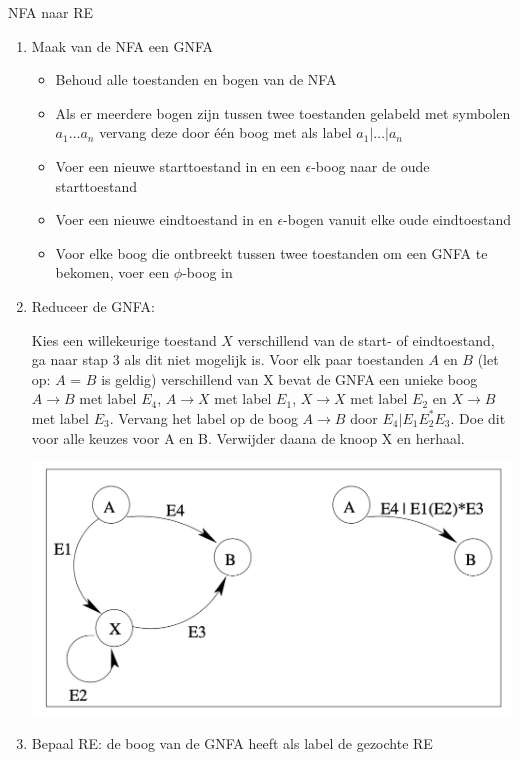 \begin{alg}[NFA $\to$ RE]{NFA naar RE}
    \begin{enumerate}
        \item Maak van de NFA een GNFA
        \begin{itemize}
            \item Behoud alle toestanden en bogen van de NFA
            \item Als er meerdere bogen zijn tussen twee toestanden gelabeld met symbolen \(a_{1} \ldots a_{n} \) vervang deze door één boog met als label \(a_{1} | \ldots | a_{n} \)
            \item Voer een nieuwe starttoestand in en een \(\epsilon\)-boog naar de oude starttoestand
            \item Voer een nieuwe eindtoestand in en \(\epsilon\)-bogen vanuit elke oude eindtoestand
            \item Voor elke boog die ontbreekt tussen twee toestanden om een GNFA te bekomen, voer een \(\phi\)-boog in
        \end{itemize}
        \item Reduceer de GNFA: \vspace{0.3cm} \\
            \begin{minipage}{.453\textwidth} 
                Kies een willekeurige toestand \(X\) verschillend van de start- of eindtoestand, ga naar stap 3 als dit niet mogelijk is.
                Voor elk paar toestanden \(A\) en \(B\) (let op: \(A\) = \(B\) is geldig) verschillend van X bevat de GNFA een unieke boog \(A \to B\) met label \(E_{4}\), 
                \(A \to X\) met label \(E_{1}\), \(X \to X\) met label \(E_{2}\) en \(X \to B\) met label \(E_{3}\). Vervang het label op de boog \(A \to B\) door \(E_{4} | E_{1}E_{2}^{*}E_{3}\).
                Doe dit voor alle keuzes voor A en B. Verwijder daana de knoop X en herhaal.
            \end{minipage}
            \begin{minipage}{.43\textwidth}
                \hspace{0.3cm}\includegraphics[scale = 0.375]{Images/GNFAToestandVerwijderen}
            \end{minipage}
        \item Bepaal RE: de boog van de GNFA heeft als label de gezochte RE
    \end{enumerate}
\end{alg}

